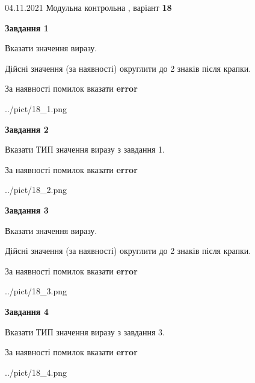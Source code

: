 \documentclass[11pt, ukrainian]{article}
\begin{document}
{04.11.2021 Модульна контрольна , варіант  \No \textbf { 18 }\par}
{
\begin {large}
{\begin {center}\textbf{Завдання 1}\end {center}}\par
Вказати значення виразу. \par
Дійсні значення (за наявності) округлити до 2 знаків після крапки. \par
За наявності помилок вказати \textbf{error}

\begin{center}
	{../pict/18_1.png}
\end{center}
\newpage

{\begin {center}\textbf{Завдання 2}\end {center}}\par
Вказати ТИП значення виразу з завдання 1. \par
За наявності помилок вказати \textbf{error}

\begin{center}
	{../pict/18_2.png}
\end{center}
\newpage

{\begin {center}\textbf{Завдання 3}\end {center}}\par
Вказати значення виразу. \par
Дійсні значення (за наявності) округлити до 2 знаків після крапки. \par
За наявності помилок вказати \textbf{error}

\begin{center}
	{../pict/18_3.png}
\end{center}
\newpage

{\begin {center}\textbf{Завдання 4}\end {center}}\par
Вказати ТИП значення виразу з завдання 3. \par
За наявності помилок вказати \textbf{error}

\begin{center}
	{../pict/18_4.png}
\end{center}
\newpage


\end{large}}
\end{document}
